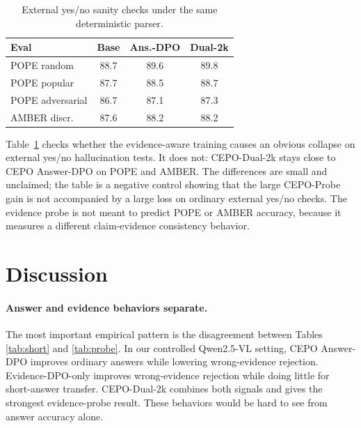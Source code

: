 \documentclass[10pt,twocolumn,letterpaper]{article}
\newcommand{\benchmark}{CEPO-Probe}
\newcommand{\answerdpo}{CEPO Answer-DPO}
\newcommand{\evidencedpo}{Evidence-DPO-only}
\newcommand{\dualtwok}{CEPO-Dual-2k}
\begin{document}
\begin{table}[t]
\centering
\footnotesize
\setlength{\tabcolsep}{2.5pt}
\begin{tabular}{lccc}
\toprule
Eval & Base & Ans.-DPO & Dual-2k \\
\midrule
POPE random & 88.7 & 89.6 & 89.8 \\
POPE popular & 87.7 & 88.5 & 88.7 \\
POPE adversarial & 86.7 & 87.1 & 87.3 \\
AMBER discr. & 87.6 & 88.2 & 88.2 \\
\bottomrule
\end{tabular}
\caption{External yes/no sanity checks under the same deterministic parser.}
\label{tab:external}
\end{table}

Table~\ref{tab:external} checks whether the evidence-aware training causes an
obvious collapse on external yes/no hallucination tests. It does not:
\dualtwok{} stays close to \answerdpo{} on POPE and AMBER. The differences are
small and unclaimed; the table is a negative control showing that the large
\benchmark{} gain is not accompanied by a large loss on ordinary external
yes/no checks. The evidence probe is not meant to predict POPE or AMBER
accuracy, because it measures a different claim-evidence consistency behavior.

\section{Discussion}

\paragraph{Answer and evidence behaviors separate.}
The most important empirical pattern is the disagreement between Tables
\ref{tab:short} and \ref{tab:probe}. In our controlled Qwen2.5-VL setting,
\answerdpo{} improves ordinary answers while lowering wrong-evidence rejection.
\evidencedpo{} improves
wrong-evidence rejection while doing little for short-answer transfer.
\dualtwok{} combines both signals and gives the strongest evidence-probe
result. These behaviors would be hard to see from answer accuracy alone.
\end{document}
